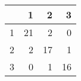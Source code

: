 \begin{tabular}{rrrr}
  \hline
 & 1 & 2 & 3 \\ 
  \hline
1 &  21 &   2 &   0 \\ 
  2 &   2 &  17 &   1 \\ 
  3 &   0 &   1 &  16 \\ 
   \hline
\end{tabular}
